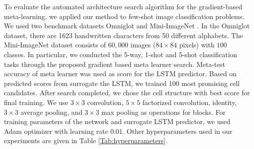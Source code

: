 \documentclass{article}
\begin{document}
To evaluate the automated architecture search algorithm for the gradient-based meta-learning, we applied our method to few-shot image classification problems. We used two benchmark datasets Omniglot \cite{Lake1332} and Mini-ImageNet \cite{Vinyals:nips2016:DBLP:conf/nips/VinyalsBLKW16}\cite{ravi:opt_fewshot:DBLP:conf/iclr/RaviL17}. In the Omniglot dataset, there are 1623 handwritten characters from 50 different alphabets. The Mini-ImageNet dataset consists of $60,000$ images ($84\times 84$  pixels) with $100$ classes.
In particular, we conducted the 5-way, 1-shot and 5-shot classification tasks through the proposed gradient based meta learner search.
Meta-test accuracy of meta learner was used as score for the LSTM predictor. Based on predicted scores from surrogate the LSTM, we trained 100 most promising cell candidates.
After search completed, we chose the cell structure with best score for final training. We use $3\times3$ convolution, $5\times5$ factorized convolution, identity, $3\times3$ average pooling, and $3\times3$ max pooling as operations for blocks. For training parameters of the network and surrogate LSTM predictor, we used Adam optimizer with learning rate $0.01$. Other hyperparameters used in our experiments are given in Table \ref{Tab:hyperparameters}.
\end{document}
